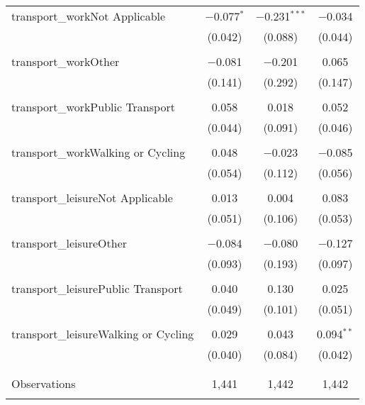 \begin{tabular}{@{\extracolsep{5pt}}lccc}
 transport\_workNot Applicable & $-$0.077$^{*}$ & $-$0.231$^{***}$ & $-$0.034 \\ 
  & (0.042) & (0.088) & (0.044) \\ 
  & & & \\ 
 transport\_workOther & $-$0.081 & $-$0.201 & 0.065 \\ 
  & (0.141) & (0.292) & (0.147) \\ 
  & & & \\ 
 transport\_workPublic Transport & 0.058 & 0.018 & 0.052 \\ 
  & (0.044) & (0.091) & (0.046) \\ 
  & & & \\ 
 transport\_workWalking or Cycling & 0.048 & $-$0.023 & $-$0.085 \\ 
  & (0.054) & (0.112) & (0.056) \\ 
  & & & \\ 
 transport\_leisureNot Applicable & 0.013 & 0.004 & 0.083 \\ 
  & (0.051) & (0.106) & (0.053) \\ 
  & & & \\ 
 transport\_leisureOther & $-$0.084 & $-$0.080 & $-$0.127 \\ 
  & (0.093) & (0.193) & (0.097) \\ 
  & & & \\ 
 transport\_leisurePublic Transport & 0.040 & 0.130 & 0.025 \\ 
  & (0.049) & (0.101) & (0.051) \\ 
  & & & \\ 
 transport\_leisureWalking or Cycling & 0.029 & 0.043 & 0.094$^{**}$ \\ 
  & (0.040) & (0.084) & (0.042) \\ 
  & & & \\ 
\hline \\[-1.8ex] 

Observations & 1,441 & 1,442 & 1,442 \\ 
\hline 
\hline \\[-1.8ex] 
\end{tabular} 